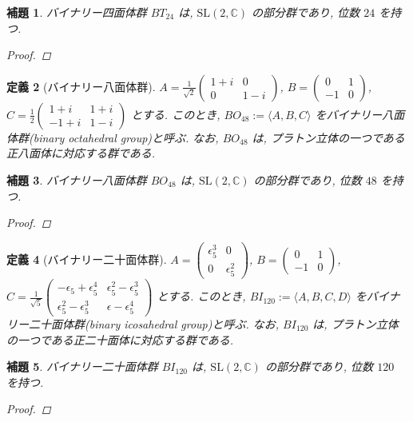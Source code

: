 \documentclass[xelatex,a4paper,ja=standard]{bxjsreport}
\newtheorem{definition}{定義}%
\newtheorem{lemma}[definition]{補題}%
\begin{document}
\begin{lemma}
    バイナリー四面体群 \(BT_{24}\) は, \(\mathrm{SL}(2, \mathbb{C})\) の部分群であり, 位数 \(24\) を持つ.
    \begin{proof}
    
    \end{proof}
\end{lemma}


\begin{definition}[バイナリー八面体群]
    \(A = \frac{1}{\sqrt{2}} \begin{pmatrix} 1 + i & 0 \\ 0 & 1 - i \end{pmatrix}\),
    \(B = \begin{pmatrix} 0 & 1 \\ -1 & 0 \end{pmatrix}\),
    \(C = \frac{1}{2} \begin{pmatrix} 1 + i & 1 + i \\ -1 + i & 1 - i \end{pmatrix}\) とする.
    このとき, \(BO_{48} := \langle A, B, C \rangle\) をバイナリー八面体群(binary octahedral group)と呼ぶ.
    なお, \(BO_{48}\) は, プラトン立体の一つである正八面体に対応する群である.
\end{definition}


\begin{lemma}
    バイナリー八面体群 \(BO_{48}\) は, \(\mathrm{SL}(2, \mathbb{C})\) の部分群であり, 位数 \(48\) を持つ.
    \begin{proof}
    
    \end{proof}
\end{lemma}



\begin{definition}[バイナリー二十面体群]
    \(A = \begin{pmatrix} \epsilon_5^3 & 0 \\ 0 & \epsilon_5^2 \end{pmatrix}\),
    \(B = \begin{pmatrix} 0 & 1 \\ -1 & 0 \end{pmatrix}\),
    \(C = \frac{1}{\sqrt{5}} \begin{pmatrix} -\epsilon_5 + \epsilon_5^4 & \epsilon_5^2 - \epsilon_5^3 \\ \epsilon_5^2 - \epsilon_5^3 & \epsilon - \epsilon_5^4 \end{pmatrix}\) とする.
    このとき, \(BI_{120} := \langle A, B, C, D \rangle\) をバイナリー二十面体群(binary icosahedral group)と呼ぶ.
    なお, \(BI_{120}\) は, プラトン立体の一つである正二十面体に対応する群である.
\end{definition}


\begin{lemma}
    バイナリー二十面体群 \(BI_{120}\) は, \(\mathrm{SL}(2, \mathbb{C})\) の部分群であり, 位数 \(120\) を持つ.
    \begin{proof}
    
    \end{proof}
\end{lemma}
\end{document}
